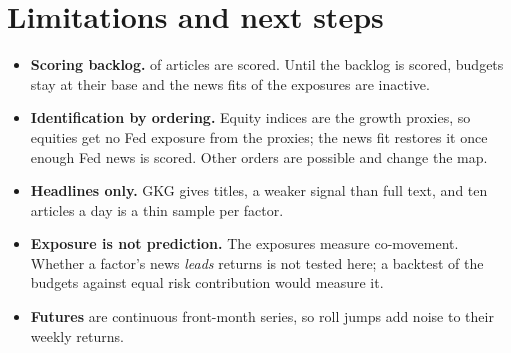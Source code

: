 \documentclass[11pt,a4paper]{article}
\begin{document}
\section{Limitations and next steps}
\begin{itemize}
\item \textbf{Scoring backlog.} \ScoredCount{} of \NewsCount{} articles are scored. Until the backlog is scored,
  budgets stay at their base and the news fits of the exposures are inactive.
\item \textbf{Identification by ordering.} Equity indices are the growth proxies, so equities get no Fed exposure
  from the proxies; the news fit restores it once enough Fed news is scored. Other orders are possible and change
  the map.
\item \textbf{Headlines only.} GKG gives titles, a weaker signal than full text, and ten articles a day is a thin
  sample per factor.
\item \textbf{Exposure is not prediction.} The exposures measure co-movement. Whether a factor's news \emph{leads}
  returns is not tested here; a backtest of the budgets against equal risk contribution would measure it.
\item \textbf{Futures} are continuous front-month series, so roll jumps add noise to their weekly returns.
\end{itemize}
\end{document}
